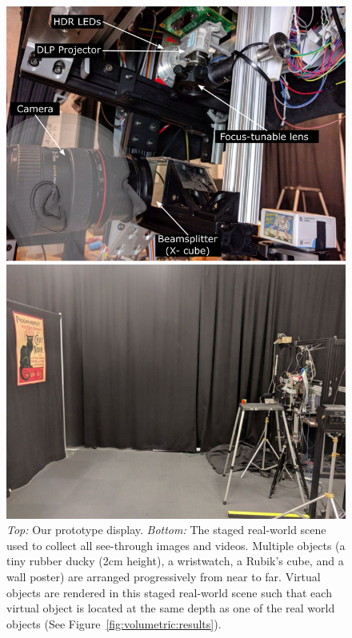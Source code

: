 \begin{figure}[t]
\centering
\includegraphics[width=0.8\columnwidth]{images/volumetric/setup}
\caption[Volumetric NED: prototype and staged real-world scene for capturing results]{\emph{Top:} Our prototype display. \emph{Bottom:} The staged real-world scene used to collect all see-through images and videos. Multiple objects (a tiny rubber ducky (2cm height), a wristwatch, a Rubik's cube, and a wall poster) are arranged progressively from near to far. Virtual objects are rendered in this staged real-world scene such that each virtual object is located at the same depth as one of the real world objects (See Figure~\ref{fig:volumetric:results}).}
\label{fig:volumetric:setup}
\end{figure}

